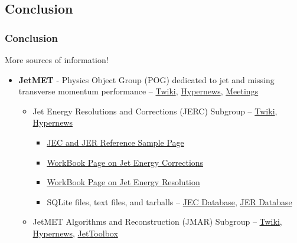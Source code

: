 
\subsection{Conclusion}
\label{sec:conclusion}
\begin{frame}		
	\frametitle{Conclusion}
	\vspace*{-0.24cm}
	\begin{block}{More sources of information!}
		\begin{itemize}
			\footnotesize
			\item \textbf{JetMET} - Physics Object Group (POG) dedicated to jet and missing transverse momentum performance  -- \href{https://twiki.cern.ch/twiki/bin/view/CMS/JetMET}{Twiki}, \href{https://hypernews.cern.ch/HyperNews/CMS/get/JetMET.html}{Hypernews}, \href{https://indico.cern.ch/category/1308}{Meetings}
			\begin{itemize}
				\footnotesize
				\item Jet Energy Resolutions and Corrections (JERC) Subgroup -- \href{https://twiki.cern.ch/twiki/bin/view/CMS/JetEnergyScale}{Twiki}, \href{https://hypernews.cern.ch/HyperNews/CMS/get/jes.html}{Hypernews}
				\begin{itemize}
					\scriptsize
					\item \href{https://twiki.cern.ch/twiki/bin/view/CMS/JERCReference}{JEC and JER Reference Sample Page}
					\item \href{https://twiki.cern.ch/twiki/bin/view/CMSPublic/WorkBookJetEnergyCorrections?redirectedfrom=CMS.WorkBookJetEnergyCorrections}{WorkBook Page on Jet Energy Corrections}
					\item \href{https://twiki.cern.ch/twiki/bin/view/CMSPublic/WorkBookJetEnergyResolution}{WorkBook Page on Jet Energy Resolution}
					\item SQLite files, text files, and tarballs -- \href{https://github.com/cms-jet/JECDatabase}{JEC Database}, \href{https://github.com/cms-jet/JRDatabase}{JER Database}
				\end{itemize}
				\item JetMET Algorithms and Reconstruction (JMAR) Subgroup -- \href{https://twiki.cern.ch/twiki/bin/view/CMS/JetEnergyScale}{Twiki}, \href{https://hypernews.cern.ch/HyperNews/CMS/get/jet-algorithms.html}{Hypernews}, \href{https://twiki.cern.ch/twiki/bin/view/CMS/JetToolbox}{JetToolbox}

\end{itemize}
\end{itemize}
\end{block}
\end{frame}
